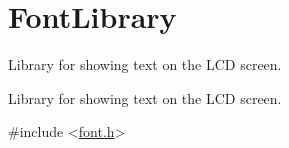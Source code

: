 \hypertarget{group___font_library}{}\section{Font\+Library}
\label{group___font_library}


Library for showing text on the L\+C\+D screen.  


Library for showing text on the L\+C\+D screen. 


\begin{DoxyCode}
\textcolor{preprocessor}{#include <\hyperlink{font_8h}{font.h}>} 
\end{DoxyCode}
 